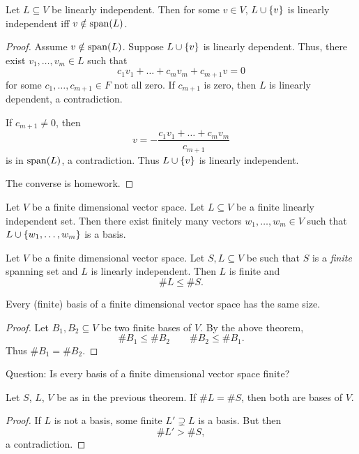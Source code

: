 \begin{prop}[] \label{prop:}
    Let $L \subseteq V$ be linearly independent.
    Then for some $v \in V$, $L \cup \set{v}$ is linearly independent iff $v \notin \operatorname{span}(L)$.
\end{prop}
\begin{proof}
    Assume $v \notin \operatorname{span}(L)$.
    Suppose $L \cup \set{v}$ is linearly dependent. Thus, there exist $v_{1}, \dots, v_{m} \in L$ such that \[
        c_{1} v_{1} + \dots + c_{m} v_{m} + c_{m + 1} v = 0
    \] for some $c_{1}, \dots, c_{m + 1} \in F$ not all zero.
    If $c_{m+1}$ is zero, then $L$ is linearly dependent, a contradiction.

    If $c_{m+1} \neq 0$, then \[
        v = -\frac{c_{1} v_{1} + \dots + c_{m} v_{m}}{c_{m + 1}}
    \] is in $\operatorname{span}(L)$, a contradiction.
    Thus $L \cup \set{v}$ is linearly independent.

    The converse is \textcolor{red!70!black}{homework}.
\end{proof}
\begin{cor}[] \label{cor:}
    Let $V$ be a finite dimensional vector space.
    Let $L \subseteq V$ be a finite linearly independent set.
    Then there exist finitely many vectors $w_{1}, \dots, w_{m} \in V$ such that $L \cup \set{w_{1}, \dots, w_{m}}$ is a basis.
\end{cor}

\begin{thm}[] \label{thm:}
    Let $V$ be a finite dimensional vector space. Let $S, L \subseteq V$ be such that $S$ is a \emph{finite} spanning set and $L$ is linearly independent. Then $L$ is finite and \[
        \#L \leq \#S.
    \]
\end{thm}
\begin{cor}[] \label{cor:}
    Every (finite) basis of a finite dimensional vector space has the same size.
\end{cor}
\begin{proof}
    Let $B_{1}, B_{2} \subseteq V$ be two finite bases of $V$.
    By the above theorem, \[
        \#B_{1} \leq \#B_{2} \qquad \#B_{2} \leq \#B_{1}.
    \] Thus $\#B_{1} = \#B_{2}$.
\end{proof}

\textcolor{orange!60!black}{Question: Is every basis of a finite dimensional vector space finite?}

\begin{cor}[] \label{cor:}
    Let $S$, $L$, $V$ be as in the previous theorem.
    If $\#L = \#S$, then both are bases of $V$.
\end{cor}
\begin{proof}
    If $L$ is not a basis, some finite $L' \supsetneq L$ is a basis. But then \[
        \#L' > \#S,
    \] a contradiction.
\end{proof}
